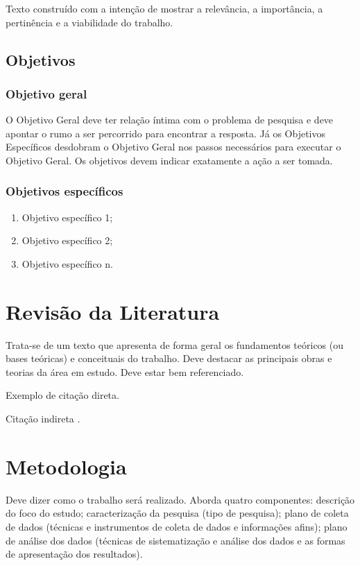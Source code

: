 \documentclass{unemat-tex}
\begin{document}
		Texto construído com a intenção de mostrar	a relevância, a importância, a pertinência e a viabilidade do trabalho.
	
	\section{Objetivos}
	
		\subsection{Objetivo geral}
		
			O Objetivo Geral deve ter relação íntima com o problema de	pesquisa e deve apontar o rumo a ser percorrido para encontrar a resposta. Já os	Objetivos Específicos desdobram o Objetivo Geral nos passos necessários para executar o	Objetivo Geral. Os objetivos devem indicar	exatamente a ação a ser tomada.
		
		\subsection{Objetivos específicos}
		
			\begin{enumerate}
				\item Objetivo específico 1;
				\item Objetivo específico 2;
				\item Objetivo específico n.
			\end{enumerate}

\chapter{Revisão da Literatura}
	
	Trata-se de um texto que apresenta de forma	geral os fundamentos teóricos (ou bases	teóricas) e conceituais do trabalho. Deve destacar as principais obras e teorias da área em estudo. Deve estar bem referenciado.
	
	\begin{citacao}
		Exemplo de citação direta. \cite{nomenacitacao}
	\end{citacao}
	
	Citação indireta \cite{nomenacitacao}.
	
\chapter{Metodologia}
	
	Deve dizer como o trabalho será realizado. Aborda quatro componentes: descrição do foco do estudo; caracterização da pesquisa (tipo de pesquisa); plano de coleta de dados (técnicas e instrumentos de coleta de dados e informações afins); plano de análise dos dados (técnicas de sistematização e análise dos dados e as formas de apresentação dos resultados).
	
\end{document}
